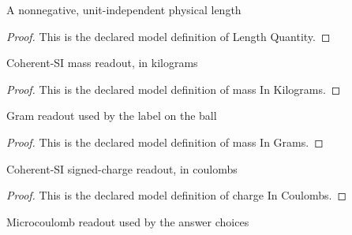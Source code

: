\begin{definition}
  \label{def:physics:phyx-mini-0904:phyxminiproblems-problemphyxmini0904-lengthquantity}
  A nonnegative, unit-independent physical length
\end{definition}
\begin{proof}
  This is the declared model definition of Length Quantity.
\end{proof}
\begin{definition}
  \label{def:physics:phyx-mini-0904:phyxminiproblems-problemphyxmini0904-massinkilograms}
  Coherent-SI mass readout, in kilograms
\end{definition}
\begin{proof}
  This is the declared model definition of mass In Kilograms.
\end{proof}
\begin{definition}
  \label{def:physics:phyx-mini-0904:phyxminiproblems-problemphyxmini0904-massingrams}
  Gram readout used by the label on the ball
\end{definition}
\begin{proof}
  This is the declared model definition of mass In Grams.
\end{proof}
\begin{definition}
  \label{def:physics:phyx-mini-0904:phyxminiproblems-problemphyxmini0904-chargeincoulombs}
  Coherent-SI signed-charge readout, in coulombs
\end{definition}
\begin{proof}
  This is the declared model definition of charge In Coulombs.
\end{proof}
\begin{definition}
  \label{def:physics:phyx-mini-0904:phyxminiproblems-problemphyxmini0904-chargeinmicrocoulombs}
  Microcoulomb readout used by the answer choices
\end{definition}
